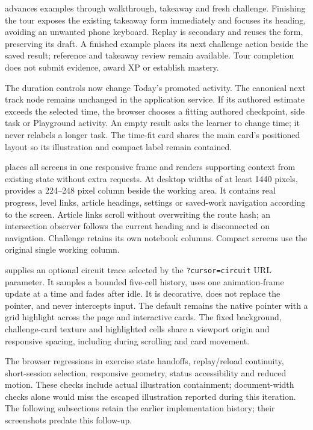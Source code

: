  advances examples through walkthrough, takeaway and fresh
challenge. Finishing the tour exposes the existing takeaway form immediately and
focuses its heading, avoiding an unwanted phone keyboard. Replay is secondary and
reuses the form, preserving its draft. A finished example places its next challenge
action beside the saved result; reference and takeaway review remain available.
Tour completion does not submit evidence, award XP or establish mastery.

The duration controls now change Today's promoted activity. The canonical next
track node remains unchanged in the application service. If its authored estimate
exceeds the selected time, the browser chooses a fitting authored checkpoint,
side task or Playground activity. An empty result asks the learner to change time;
it never relabels a longer task. The time-fit card shares the main card's positioned
layout so its illustration and compact label remain contained.

 places all screens in one responsive frame and renders
supporting context from existing state without extra requests. At desktop widths
of at least 1440 pixels,  provides a 224--248 pixel
column beside the working area. It contains real progress, level links, article
headings, settings or saved-work navigation according to the screen. Article links
scroll without overwriting the route hash; an intersection observer follows the
current heading and is disconnected on navigation. Challenge retains its own
notebook columns. Compact screens use the original single working column.

 supplies an optional circuit trace selected by the
\texttt{?cursor=circuit} URL parameter. It samples a bounded five-cell history,
uses one animation-frame update at a time and fades after idle. It is decorative,
does not replace the pointer, and never intercepts input. The default remains the
native pointer with a grid highlight across the page and interactive cards. The
fixed background, challenge-card texture and highlighted cells share a viewport
origin and responsive spacing, including during scrolling and card movement.

The browser regressions in  exercise state
handoffs, replay/reload continuity, short-session selection, responsive geometry,
status accessibility and reduced motion. These checks include actual illustration
containment; document-width checks alone would miss the escaped illustration
reported during this iteration. The following subsections retain the earlier
implementation history; their screenshots predate this follow-up.

